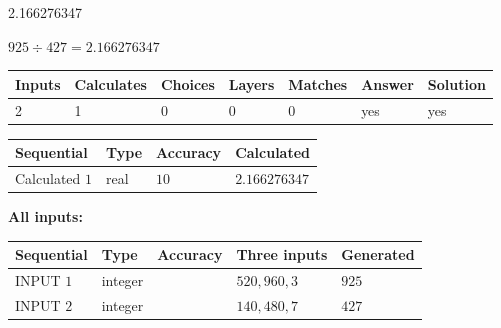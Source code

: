 \documentclass{ctexart}
\begin{document}
\noindent{}
 
 

2.166276347
 
 
\noindent{}
 
 

 
 
 
\noindent{}
 
 

$ %
925 \div  %
427=   %
2.166276347$
 
 
\noindent{}
 
 

 
   
   
   
   
\noindent\begin{tabular}{|l|l|l|l|l|l|l|}
 \hline
Inputs & Calculates & Choices & Layers & Matches & Answer & Solution \\ \hline
 2  & 
 1  & 
 0
  & 
 0  & 
 0  & 
  yes & 
  yes 
  \\ \hline
 \end{tabular}
   
   
   
   
\noindent{}
   
   
  
  
\noindent\begin{tabular}{|l|l|l|l|}
\hline
 Sequential & Type & Accuracy & Calculated \\ 
\hline
 
 
  Calculated $  1 $ & real & $  10  $ & 
 $ 2.166276347 $ 
 \\  \hline  
 \end{tabular}
   
   
   
   
\noindent\vspace{0.1in}\hspace{-0.08in} {\textbf{\Large{All inputs: }}}
   
   
  
  
\noindent\begin{tabular}{|l|l|l|l|l|}
\hline
 Sequential & Type & Accuracy & Three inputs & Generated \\ 
\hline
 
 
  INPUT $  1 $ & integer &  & $
 520
 , 
 960
 , 
 3
 $ & $ 925 $ 
 \\  \hline  
 
 
  INPUT $  2 $ & integer &  & $
 140
 , 
 480
 , 
 7
 $ & $ 427 $ 
 \\  \hline  
 \end{tabular}
   
\end{document}
